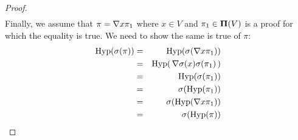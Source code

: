 \begin{proof}
\begin{eqnarray*}
    \end{eqnarray*}
Finally, we assume that $\pi=\mbox{$\nabla$} x\pi_{1}$ where $x\in V$ and
$\pi_{1}\in\mbox{${\bf\Pi}(V)$}$ is a proof for which the equality is true. We need
to show the same is true of $\pi$:
    \begin{eqnarray*}
    \mbox{\rm Hyp}(\sigma(\pi))&=&\mbox{\rm Hyp}(\sigma(\mbox{$\nabla$} x\pi_{1}))\\
    &=&\mbox{\rm Hyp}(\,\mbox{$\nabla$}\sigma(x)\sigma(\pi_{1})\,)\\
    &=&\mbox{\rm Hyp}(\sigma(\pi_{1}))\\
    &=&\sigma(\mbox{\rm Hyp}(\pi_{1}))\\
    &=&\sigma(\mbox{\rm Hyp}(\mbox{$\nabla$} x\pi_{1}))\\
    &=&\sigma(\mbox{\rm Hyp}(\pi))
    \end{eqnarray*}
\end{proof}
